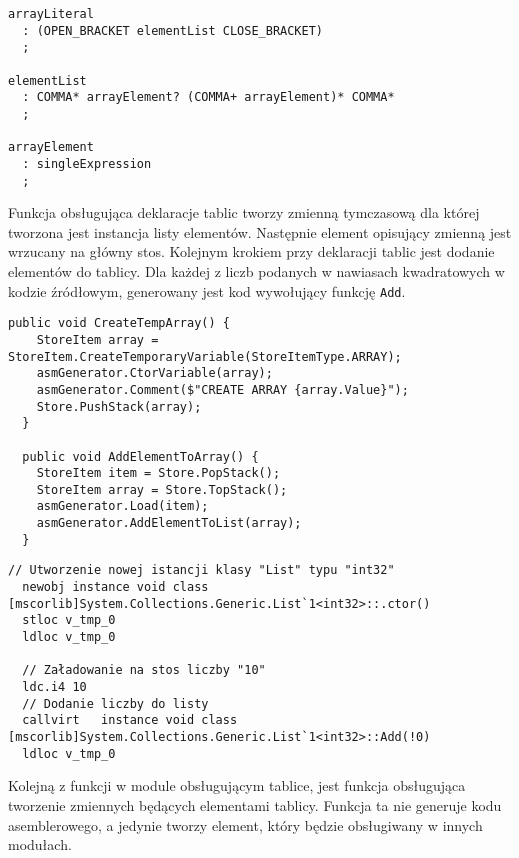 \begin{lstlisting}[caption=Definicja gramatyki dla deklaracji tablicy z wartościami, label=alg:array1]
arrayLiteral
  : (OPEN_BRACKET elementList CLOSE_BRACKET)
  ;

elementList
  : COMMA* arrayElement? (COMMA+ arrayElement)* COMMA*
  ;

arrayElement
  : singleExpression
  ;
\end{lstlisting}

\par Funkcja obsługująca deklaracje tablic tworzy zmienną tymczasową dla której tworzona jest instancja listy elementów. Następnie element opisujący zmienną jest wrzucany na główny stos. Kolejnym krokiem przy deklaracji tablic jest dodanie elementów do tablicy. Dla każdej z liczb podanych w nawiasach kwadratowych w kodzie źródłowym, generowany jest kod wywołujący funkcję \texttt{Add}.

\begin{lstlisting}[language=CSharp, caption={Implementacja funkcji obsługujących deklaracje tablicy}, label=alg:array2]
  public void CreateTempArray() {
    StoreItem array = StoreItem.CreateTemporaryVariable(StoreItemType.ARRAY);
    asmGenerator.CtorVariable(array);
    asmGenerator.Comment($"CREATE ARRAY {array.Value}");
    Store.PushStack(array);
  }
  
  public void AddElementToArray() {
    StoreItem item = Store.PopStack();
    StoreItem array = Store.TopStack();
    asmGenerator.Load(item);
    asmGenerator.AddElementToList(array);
  }
\end{lstlisting}

\begin{lstlisting}[language=IL, caption={Kod assemblera przedstawiający deklarację tablicy}, label=alg:array3]
  // Utworzenie nowej istancji klasy "List" typu "int32"
  newobj instance void class [mscorlib]System.Collections.Generic.List`1<int32>::.ctor()
  stloc v_tmp_0
  ldloc v_tmp_0

  // Załadowanie na stos liczby "10"
  ldc.i4 10
  // Dodanie liczby do listy
  callvirt   instance void class [mscorlib]System.Collections.Generic.List`1<int32>::Add(!0)
  ldloc v_tmp_0
\end{lstlisting}

\par Kolejną z funkcji w module obsługującym tablice, jest funkcja obsługująca tworzenie zmiennych będących elementami tablicy. Funkcja ta nie generuje kodu asemblerowego, a jedynie tworzy element, który będzie obsługiwany w innych modułach.

